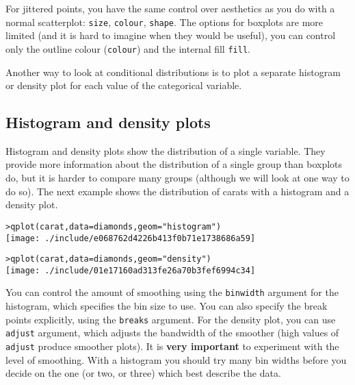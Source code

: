% 
For jittered points, you have the same control over aesthetics as you do with a normal scatterplot: {\tt size}, {\tt colour}, {\tt shape}.  The options for boxplots are more limited (and it is hard to imagine when they would be useful), you can control only the outline colour ({\tt colour}) and the internal fill {\tt fill}.

Another way to look at conditional distributions is to plot a separate histogram or density plot for each value of the categorical variable.

\subsection{Histogram and density plots}\label{sub:density}

Histogram and density plots show the distribution of a single variable.  They provide more information about the distribution of a single group than boxplots do, but it is harder to compare many groups (although we will look at one way to do so).  The next example shows the distribution of carats with a histogram and a density plot.

\begin{alltt}
> qplot(carat, data = diamonds, geom = "histogram")
\texttt{[image: ./include/e068762d4226b413f0b71e1738686a59]}

> qplot(carat, data = diamonds, geom = "density")
\texttt{[image: ./include/01e17160ad313fe26a70b3fef6994c34]}

\end{alltt}

You can control the amount of smoothing using the {\tt binwidth} argument for the histogram, which specifies the bin size to use.  You can also specify the break points explicitly, using the {\tt breaks} argument.  For the density plot, you can use {\tt adjust} argument, which adjusts the bandwidth of the smoother (high values of {\tt adjust} produce smoother plots).  It is {\bf very important} to experiment with the level of smoothing.  With a histogram you should try many bin widths before you decide on the one (or two, or three) which best describe the data.

